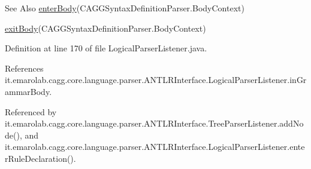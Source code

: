 \begin{DoxySeeAlso}{See Also}
\hyperlink{classit_1_1emarolab_1_1cagg_1_1core_1_1language_1_1parser_1_1ANTLRInterface_1_1LogicalParserListener_ae0564f0dc58f8704b8dee56b7caac3ea}{enter\-Body}(C\-A\-G\-G\-Syntax\-Definition\-Parser.\-Body\-Context) 

\hyperlink{classit_1_1emarolab_1_1cagg_1_1core_1_1language_1_1parser_1_1ANTLRInterface_1_1LogicalParserListener_ac1660e12686fbe452aa6cff3fb7e30d2}{exit\-Body}(C\-A\-G\-G\-Syntax\-Definition\-Parser.\-Body\-Context) 
\end{DoxySeeAlso}


Definition at line 170 of file Logical\-Parser\-Listener.\-java.



References it.\-emarolab.\-cagg.\-core.\-language.\-parser.\-A\-N\-T\-L\-R\-Interface.\-Logical\-Parser\-Listener.\-in\-Grammar\-Body.



Referenced by it.\-emarolab.\-cagg.\-core.\-language.\-parser.\-A\-N\-T\-L\-R\-Interface.\-Tree\-Parser\-Listener.\-add\-Node(), and it.\-emarolab.\-cagg.\-core.\-language.\-parser.\-A\-N\-T\-L\-R\-Interface.\-Logical\-Parser\-Listener.\-enter\-Rule\-Declaration().


